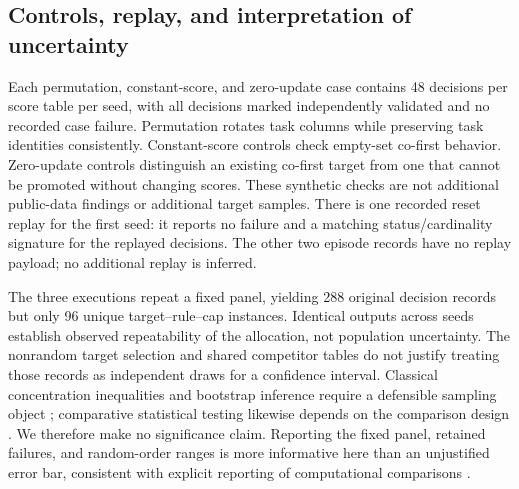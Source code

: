\documentclass{article}
\begin{document}
\subsection{Controls, replay, and interpretation of uncertainty}
Each permutation, constant-score, and zero-update case contains 48 decisions per score table per seed, with all decisions marked independently validated and no recorded case failure. Permutation rotates task columns while preserving task identities consistently. Constant-score controls check empty-set co-first behavior. Zero-update controls distinguish an existing co-first target from one that cannot be promoted without changing scores. These synthetic checks are not additional public-data findings or additional target samples. There is one recorded reset replay for the first seed: it reports no failure and a matching status/cardinality signature for the replayed decisions. The other two episode records have no replay payload; no additional replay is inferred.

The three executions repeat a fixed panel, yielding 288 original decision records but only 96 unique target--rule--cap instances. Identical outputs across seeds establish observed repeatability of the allocation, not population uncertainty. The nonrandom target selection and shared competitor tables do not justify treating those records as independent draws for a confidence interval. Classical concentration inequalities and bootstrap inference require a defensible sampling object \citep{Hoeffding1963Bounds,Efron1979Bootstrap}; comparative statistical testing likewise depends on the comparison design \citep{Demsar2006Comparisons}. We therefore make no significance claim. Reporting the fixed panel, retained failures, and random-order ranges is more informative here than an unjustified error bar, consistent with explicit reporting of computational comparisons \citep{Dodge2019Reporting}.
\end{document}
